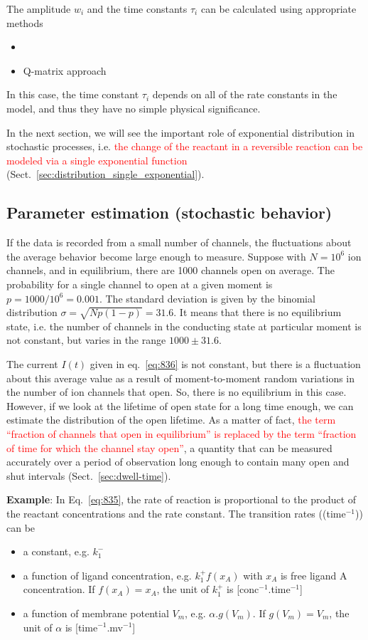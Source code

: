 The amplitude $w_i$ and the time constants $\tau_i$ can be calculated
using appropriate methods
\begin{itemize}
\item ~\citep{colquhoun1977rfm}
\item Q-matrix approach
\end{itemize}
In this case, the time constant $\tau_i$ depends on all of the rate
constants in the model, and thus they have no simple physical
significance.

In the next section, we will see the important role of exponential
distribution in stochastic processes, i.e.
\textcolor{red}{the change of the reactant in a reversible reaction
  can be modeled via a single exponential function}
(Sect.~\ref{sec:distribution_single_exponential}).


\subsection{Parameter estimation (stochastic behavior)}
\label{sec:param-estim-stoch}

If the data is recorded from a small number of channels, the
fluctuations about the average behavior become large enough to
measure. Suppose with $N=10^6$ ion channels, and in equilibrium, there
are 1000 channels open on average. The probability for a single
channel to open at a given moment is $p=1000/10^6=0.001$. The standard
deviation is given by the binomial distribution $\sigma=\sqrt{Np(1-p)}
= 31.6$. It means that there is no equilibrium state, i.e. the number
of channels in the conducting state at particular moment is not
constant, but varies in the range $1000\pm 31.6$.

The current $I(t)$ given in eq.~\eqref{eq:836} is not constant, but
there is a fluctuation about this average value as a result of
moment-to-moment random variations in the number of ion channels that
open. So, there is no equilibrium in this case. However, if we look at
the lifetime of open state for a long time enough, we can estimate the
distribution of the open lifetime. As a matter of fact,
\textcolor{red}{the term ``fraction of channels that open in
  equilibrium'' is replaced by the term ``fraction of time for which
  the channel stay open''},
a quantity that can be measured accurately over a period of
observation long enough to contain many open and shut intervals
(Sect.~\ref{sec:dwell-time}).

{\bf Example}: In Eq.~\eqref{eq:835}, the rate of reaction is
proportional to the product of the reactant concentrations and the
rate constant. The transition rates ((time$^{-1}$)) can be
\begin{itemize}
\item a constant, e.g. $k^-_1$
\item a function of ligand concentration, e.g. $k_1^+f(x_A)$ with
  $x_A$ is free ligand A concentration. If $f(x_A)=x_A$, the unit of
  $k_1^+$ is [conc$^{-1}$.time$^{-1}$]
\item a function of membrane potential $V_m$, e.g. $\alpha.g(V_m)$. If
  $g(V_m)=V_m$, the unit of $\alpha$ is [time$^{-1}$.mv$^{-1}$]
\end{itemize}

